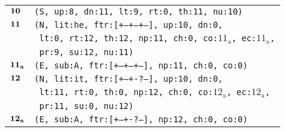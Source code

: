 \documentclass{article}
\begin{document}
\begin{minipage}{\textwidth}
{\begin{tabular}{|r|l|}
    ${\textbf{\textrm{10}}_{\phantom{z}}}$ & \texttt{\texttt{(S,~up:8,~dn:11,~lt:9,~rt:0,~th:11,~nu:10)}} \\
    ${\textbf{\textrm{11}}_{\phantom{z}}}$ & \texttt{\texttt{(N,~lit:he,~ftr:[+--+--+--],~up:10,~dn:0,}} \\
    & \texttt{\texttt{~lt:0,~rt:12,~th:12,~np:11,~ch:0,~co:${\textrm{11}_{\textrm{a}}}$,~ec:${\textrm{11}_{\textrm{a}}}$,}} \\
    & \texttt{\texttt{~pr:9,~su:12,~nu:11)}} \\
    ${\textbf{\textrm{11}}_{\textbf{\textrm{a}}}}$ & \texttt{\texttt{(E,~sub:A,~ftr:[+--+--+--],~np:11,~ch:0,~co:0)}} \\
    ${\textbf{\textrm{12}}_{\phantom{z}}}$ & \texttt{\texttt{(N,~lit:it,~ftr:[+--+-?---],~up:10,~dn:0,}} \\
    & \texttt{\texttt{~lt:11,~rt:0,~th:0,~np:12,~ch:0,~co:${\textrm{12}_{\textrm{a}}}$,~ec:${\textrm{12}_{\textrm{a}}}$,}} \\
    & \texttt{\texttt{~pr:11,~su:0,~nu:12)}} \\
    ${\textbf{\textrm{12}}_{\textbf{\textrm{a}}}}$ & \texttt{\texttt{(E,~sub:A,~ftr:[+--+-?---],~np:12,~ch:0,~co:0)}} \\
    \hline
  \end{tabular}
  }
\end{minipage}
\bigbreak
\end{document}
